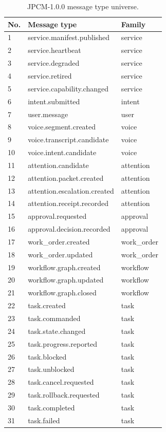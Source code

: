 \documentclass[journal,onecolumn]{IEEEtran}
\begin{document}
\begin{longtable}{p{}p{}p{}}
\caption{JPCM-1.0.0 message type universe.}\\
\toprule
No. & Message type & Family\\
\midrule
1 & service.manifest.published & service\\
2 & service.heartbeat & service\\
3 & service.degraded & service\\
4 & service.retired & service\\
5 & service.capability.changed & service\\
6 & intent.submitted & intent\\
7 & user.message & user\\
8 & voice.segment.created & voice\\
9 & voice.transcript.candidate & voice\\
10 & voice.intent.candidate & voice\\
11 & attention.candidate & attention\\
12 & attention.packet.created & attention\\
13 & attention.escalation.created & attention\\
14 & attention.receipt.recorded & attention\\
15 & approval.requested & approval\\
16 & approval.decision.recorded & approval\\
17 & work\_order.created & work\_order\\
18 & work\_order.updated & work\_order\\
19 & workflow.graph.created & workflow\\
20 & workflow.graph.updated & workflow\\
21 & workflow.graph.closed & workflow\\
22 & task.created & task\\
23 & task.commanded & task\\
24 & task.state.changed & task\\
25 & task.progress.reported & task\\
26 & task.blocked & task\\
27 & task.unblocked & task\\
28 & task.cancel.requested & task\\
29 & task.rollback.requested & task\\
30 & task.completed & task\\
31 & task.failed & task\\

\end{longtable}
\end{document}
